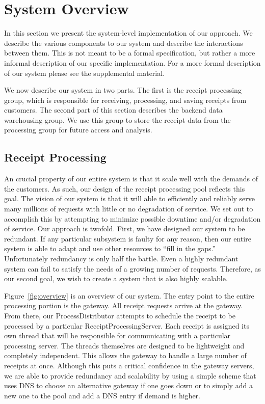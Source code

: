 \section{System Overview}
\label{sec:overview}

In this section we present the system-level implementation of our
approach. We describe the various components to our system and
describe the interactions between them. This is not meant to be a
formal specification, but rather a more informal description of our
specific implementation. For a more formal description of our system
please see the supplemental material.

We now describe our system in two parts. The first is the receipt
processing group, which is responsible for receiving, processing, and
saving receipts from customers. The second part of this section
describes the backend data warehousing group. We use this group to
store the receipt data from the processing group for future access and
analysis.

\subsection{Receipt Processing}
\label{sec:overview.processing}

An crucial property of our entire system is that it scale well with
the demands of the customers. As such, our design of the receipt
processing pool reflects this goal. The vision of our system is that
it will able to efficiently and reliably serve many millions of
requests with little or no degradation of service. We set out to
accomplish this by attempting to minimize possible downtime and/or
degradation of service. Our approach is twofold. First, we have
designed our system to be redundant. If any particular subsystem is
faulty for any reason, then our entire system is able to adapt and use
other resources to ``fill in the gaps.'' Unfortunately redundancy is
only half the battle. Even a highly redundant system can fail to
satisfy the needs of a growing number of requests. Therefore, as our
second goal, we wish to create a system that is also highly scalable.

Figure~\ref{fig:overview} is an overview of our system. The entry
point to the entire processing portion is the gateway. All receipt
requests arrive at the gateway. From there, our ProcessDistributor
attempts to schedule the receipt to be processed by a particular
ReceiptProcessingServer. Each receipt is assigned its own thread that
will be responsible for communicating with a particular processing
server. The threads themselves are designed to be lightweight and
completely independent. This allows the gateway to handle a large
number of receipts at once. Although this puts a critical confidence
in the gateway servers, we are able to provide redundancy and
scalability by using a simple scheme that uses DNS to choose an
alternative gateway if one goes down or to simply add a new one to the
pool and add a DNS entry if demand is higher.

